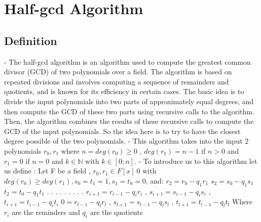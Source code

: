 \newpage
\section{Half-gcd Algorithm}
\subsection{Definition }
\newline - The half-gcd algorithm is an algorithm used to compute the greatest common divisor (GCD) of two polynomials over a field. The algorithm is based on repeated divisions and involves computing a sequence of remainders and quotients, and is known for its efficiency in certain cases. The basic idea is to divide the input polynomials into two parts of approximately equal degrees, and then compute the GCD of these two parts using recursive calls to the algorithm. Then, the algorithm combines the results of these recursive calls to compute the GCD of the input polynomials.
\newline 
So the idea here is to try to have the closest degree possible of the two polynomials.
\newline
\newline - This algorithm takes into the input 2 polynomials $r_0, r_1$ where $n = deg(r_0) \geq 0$ , $deg(r_1) = n-1$ if $ n > 0$ and $r_1 = 0$ if $n = 0$ and $k \in \mathbb{N}$ with $k \in [0;n]$.
\newline
\newline- To introduce us to this algorithm let us define :
Let F be a field ,  $ r_0,r_1\in F[x]\ {0}$ with $deg(r_0) \geq deg(r_1) , s_0 = t_1 = 1 , s_1 = t_0 =0 $, and: 
\newline
\newline $r_2 = r_0 - q_1r_1$           $s_2 = s_0 - q_1s_1$           $t_2 = t_0 - q_1t_1$
\newline          .                           .                           .
\newline          .                           .                           .
\newline          .                           .                           .                           
\newline $ r_{i+1} = r_{i-1} - q_ir_i $ ,  $ s_{i+1} = s_{i-1} - q_is_i $ ,   $ t_{i+1} = t_{i-1} - q_it_i$
\newline $ 0 = r_{l-1} - q_lr_l $ ,  $ s_{l+1} = s_{l-1} - q_ls_l $ ,   $ t_{l+1} = t_{l-1} - q_lt_l$ 
\newline
\newline Where $r_i$ are the reminders and $q_i$ are the quotients
